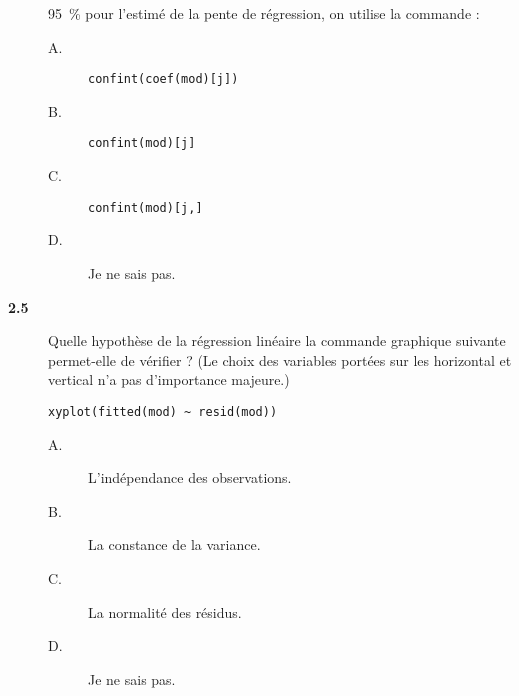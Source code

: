 \documentclass[11pt]{report}
\theoremstyle{definition}
\begin{document}
\begin{description}
  95~\% pour l'estimé de la pente de régression, on utilise la commande :
  \begin{description}
  \item[A.] \verb|confint(coef(mod)[j])|
  \item[B.] \verb|confint(mod)[j]|
  \item[C.] \verb|confint(mod)[j,]|
  \item[D.] Je ne sais pas.
  \end{description}  
\item[\bf 2.5]  Quelle hypothèse de la régression
  linéaire la commande graphique suivante permet-elle de vérifier ? (Le
  choix des variables portées sur les horizontal et vertical n'a pas
  d'importance majeure.)
\begin{verbatim}
xyplot(fitted(mod) ~ resid(mod))    
\end{verbatim}
  \begin{description}
  \item[A.] L'indépendance des observations.
  \item[B.] La constance de la variance.
  \item[C.] La normalité des résidus.
  \item[D.] Je ne sais pas.
  \end{description}
\end{description}
\end{document}
